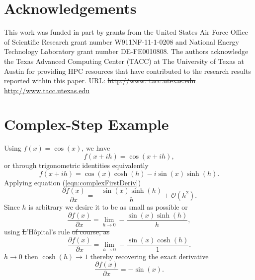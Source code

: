 \documentclass[preprint,12pt]{elsarticle}
\providecommand{\DIFaddtex}[1]{{\protect\color{blue}\uwave{#1}}} %
\providecommand{\DIFdeltex}[1]{{\protect\color{red}\sout{#1}}}                      %
\providecommand{\DIFaddbegin}{} %
\providecommand{\DIFaddend}{} %
\providecommand{\DIFdelbegin}{} %
\providecommand{\DIFdelend}{} %
\providecommand{\DIFadd}[1]{\texorpdfstring{\DIFaddtex{#1}}{#1}} %
\providecommand{\DIFdel}[1]{\texorpdfstring{\DIFdeltex{#1}}{}} %
\begin{document}
\section{Acknowledgements}
\label{sec:ack}
This work was funded in part by grants from the United States Air Force Office of Scientific Research grant number W911NF-11-1-0208 and National Energy Technology Laboratory grant number DE-FE0010808. The authors acknowledge the Texas Advanced Computing Center (TACC) at The University of Texas at Austin for providing HPC resources that have contributed to the research results reported within this paper. URL: \DIFdelbegin \DIFdel{http://www.
tacc.utexas.edu
}\DIFdelend \DIFaddbegin \url{http://www.tacc.utexas.edu}\DIFadd{.
}\DIFaddend %


\DIFaddbegin \section{\DIFadd{References}}

\DIFaddend 


\appendix
\renewcommand*{\thesection}{\Alph{section}}
%
\section{Complex-Step Example}
\label{sec:appendixA}
%
Using $f(x) = \cos(x)$, we have
%
\[
f (x + i h) = \cos(x + i h),
\]
%
or through trigonometric identities equivalently
%
\DIFdelbegin %
\DIFdelend \DIFaddbegin \[
f(x + i h) = \cos(x) \cosh(h) - i \sin(x) \sinh(h).
\]
\DIFaddend %
Applying equation (\ref{eqn:complexFirstDeriv})
\DIFdelbegin %
\DIFdelend \DIFaddbegin \[
    \frac{\partial f(x)}{\partial x} = - \frac{\sin(x) \sinh(h)}{h} + \mathcal{O}(h^2).
\]
\DIFaddend Since $h$ is arbitrary we desire it to be as small as possible or
\[
\frac{\partial f(x)}{\partial x} = \lim_{h \to 0} - \frac{\sin(x) \sinh(h)}{h},
\]
using \DIFdelbegin \DIFdel{L}\DIFdelend \DIFaddbegin \DIFadd{l}\DIFaddend 'H\^opital's rule
\DIFdelbegin %
\DIFdel{of course, as }\DIFdelend \DIFaddbegin \[
\frac{\partial f(x)}{\partial x} = \lim_{h \to 0} - \frac{\sin(x) \cosh(h)}{1}.
\]
\DIFadd{As }\DIFaddend $h \to 0$ then $\cosh(h) \to 1$ thereby recovering the exact derivative
\[
\frac{\partial f(x)}{\partial x} =-\sin(x).
\]
\end{document}
